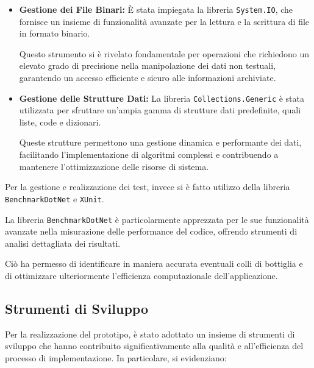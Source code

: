 \documentclass[12pt,a4paper,openright,twoside]{book}
\begin{document}
            \begin{itemize}
                \item \textbf{Gestione dei File Binari:} È stata impiegata la libreria \texttt{System.IO}, che fornisce un insieme di funzionalità avanzate per la lettura e la scrittura di file in formato binario.

                Questo strumento si è rivelato fondamentale per operazioni che richiedono un elevato grado di precisione nella manipolazione dei dati non testuali, garantendo un accesso efficiente e sicuro alle informazioni archiviate.

                \item \textbf{Gestione delle Strutture Dati:} La libreria \texttt{Collections.Generic} è stata utilizzata per sfruttare un’ampia gamma di strutture dati predefinite, quali liste, code e dizionari.

                Queste strutture permettono una gestione dinamica e performante dei dati, facilitando l’implementazione di algoritmi complessi e contribuendo a mantenere l’ottimizzazione delle risorse di sistema.
            \end{itemize}

            Per la gestione e realizzazione dei test, invece si è fatto utilizzo della libreria \texttt{BenchmarkDotNet} e \texttt{XUnit}.

            La libreria \texttt{BenchmarkDotNet} è particolarmente apprezzata per le sue funzionalità avanzate nella misurazione delle performance del codice, offrendo strumenti di analisi dettagliata dei risultati.

            Ciò ha permesso di identificare in maniera accurata eventuali colli di bottiglia e di ottimizzare ulteriormente l’efficienza computazionale dell’applicazione.

        \subsection{Strumenti di Sviluppo}

            Per la realizzazione del prototipo, è stato adottato un insieme di strumenti di sviluppo che hanno contribuito significativamente alla qualità e all’efficienza del processo di implementazione. In particolare, si evidenziano:
\end{document}
